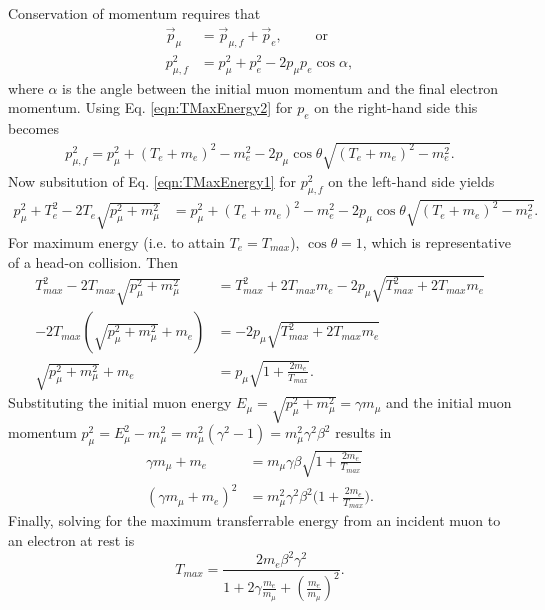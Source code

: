 Conservation of momentum requires that
\begin{align*}
\vec{p}_\mu&=\vec{p}_{\mu,f}+\vec{p}_e, \qquad\text{ or}\\
 p_{\mu,f}^2&=p_\mu ^2 + p_e^2-2p_\mu p_e \cos\alpha,
\end{align*}
where $\alpha$ is the angle between the initial muon momentum and the final electron momentum.
Using Eq. \eqref{eqn:TMaxEnergy2} for $p_e$ on the right-hand side this becomes
\begin{align*}
p_{\mu,f}^2=p_\mu ^2+(T_e+m_e)^2-m_e ^2-2p_\mu\cos\theta \sqrt{(T_e+m_e)^2-m_e^2}.
\end{align*}
Now subsitution of Eq. \eqref{eqn:TMaxEnergy1} for $p_{\mu,f} ^2$ on the left-hand side yields
\begin{align*}
p_\mu ^2+T_e ^2 - 2T_e \sqrt{p_\mu^2+m_\mu ^2}&=p_\mu ^2+(T_e+m_e)^2-m_e ^2 -2p_\mu\cos\theta\sqrt{(T_e+m_e)^2-m_e^2}.
\end{align*}
For maximum energy (i.e. to attain $T_e=T_{max}$), $\cos\theta=1$, which is representative of a head-on collision. Then
\begin{align*}
T_{max} ^2-2T_{max}\sqrt{p_\mu ^2+m_\mu ^2} &=T_{max}^2+2T_{max}m_e-2p_\mu\sqrt{T_{max}^2+2T_{max}m_e}\\
-2T_{max}(\sqrt{p_\mu ^2 + m_\mu ^2}+m_e)&=-2p_\mu\sqrt{T_{max}^2+2T_{max}m_e}\\
\sqrt{p_\mu ^2+m_\mu ^2}+m_e&=p_\mu\sqrt{1+\frac{2m_e}{T_{max}}}.
\end{align*}
Substituting the initial muon energy $E_\mu=\sqrt{p_\mu ^2+m_\mu ^2}=\gamma m_\mu$ and the initial muon momentum $p_\mu ^2=E_\mu ^2 - m_\mu ^2 = m_\mu ^2 (\gamma^2-1)=m_\mu ^2 \gamma^2 \beta^2$ results in
\begin{align*}
\gamma m_\mu + m_e &= m_\mu\gamma\beta\sqrt{1+\frac{2m_e}{T_{max}}}\\
(\gamma m_\mu +m_e)^2 &=m_\mu^2\gamma^2\beta^2 \Big(1+\frac{2m_e}{T_{max}}\Big).
\end{align*}
Finally, solving for the maximum transferrable energy from an incident muon to an electron at rest is
\begin{equation}\label{eqn:tmax}
T_{max}=\frac{2m_e \beta^2 \gamma^2}{1+2\gamma\frac{m_e}{m_\mu}+(\frac{m_e}{m_\mu})^2}.
\end{equation}

\label{ssc:ICOOLStragglingLandau}

